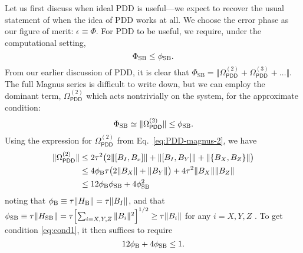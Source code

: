 \documentclass[pra,reprint,superscriptaddress]{revtex4-2}
\newcommand{\Opdd}{\Omega_{\mathsf{PDD}}}
\newcommand{\ep}{\Phi_\mathrm{SB}}
\begin{document}
Let us first discuss when ideal PDD is useful---we expect to recover the usual statement of when the idea of PDD works at all. We choose the error phase as our figure of merit: $\epsilon\equiv \Phi$. For PDD to be useful, we require, under the computational setting, 
\begin{equation}
\ep\leq \phi_\rSB.
\end{equation}
From our earlier discussion of PDD, it is clear that $\ep=\Vert \Opdd^{(2)}+\Opdd^{(3)}+\ldots\Vert$. The full Magnus series is difficult to write down, but we can employ the dominant term, $\Opdd^{(2)}$ which acts nontrivially on the system, for the approximate condition:
\begin{equation}\label{eq:cond1}
\ep\simeq\Vert \Opdd^{(2)}\Vert\leq \phi_\rSB.
\end{equation}
Using the expression for $\Opdd^{(2)}$ from Eq.~\eqref{eq:PDD-magnus-2}, we have
\begin{align}
\Vert\Opdd^{(2)}\Vert&\leq 2\tau^2{\bigl(2\Vert[B_I,B_x]\Vert+\Vert[B_I,B_Y]\Vert +\Vert\{B_X,B_Z\}\Vert\bigr)}\nonumber\\
&\leq 4\phi_\rB\tau\bigl(2\Vert B_X\Vert +\Vert B_Y\Vert\bigr) +4\tau^2\Vert B_X\Vert\Vert B_Z\Vert\nonumber\\
&\leq 12\phi_\rB\phi_\rSB+4\phi_\rSB^2\label{eq:Opdd2}
\end{align}
noting that $\phi_{\mathrm{B}}\equiv \tau\Vert H_\mathrm{B}\Vert =\tau\Vert B_I\Vert$, and that $\phi_{\mathrm{SB}}\equiv \tau\Vert H_\mathrm{SB}\Vert=\tau{\left[\sum_{i=X,Y,Z}\Vert B_i\Vert^2\right]}^{1/2}\geq \tau\Vert B_i\Vert$ for any $i=X,Y,Z$ .
To get condition \eqref{eq:cond1}, it then suffices to require
\begin{equation}
12\phi_{\mathrm{B}}+4\phi_{\mathrm{SB}}\leq1.
\end{equation}
\end{document}
